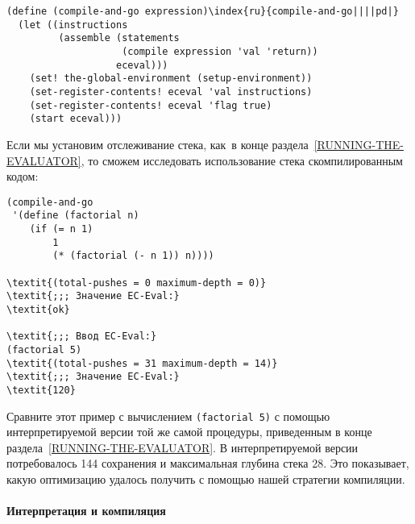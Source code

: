 \begin{Verbatim}[fontsize=\small]
(define (compile-and-go expression)\index{ru}{compile-and-go||||pd|}
  (let ((instructions
         (assemble (statements
                    (compile expression 'val 'return))
                   eceval)))
    (set! the-global-environment (setup-environment))
    (set-register-contents! eceval 'val instructions)
    (set-register-contents! eceval 'flag true)
    (start eceval)))
\end{Verbatim}

Если мы установим  
отслеживание стека, как~в конце 
раздела~\ref{RUNNING-THE-EVALUATOR}, то сможем исследовать
использование стека скомпилированным кодом:

\begin{Verbatim}[fontsize=\small]
(compile-and-go
 '(define (factorial n)
    (if (= n 1)
        1
        (* (factorial (- n 1)) n))))

\textit{(total-pushes = 0 maximum-depth = 0)}
\textit{;;; Значение EC-Eval:}
\textit{ok}

\textit{;;; Ввод EC-Eval:}
(factorial 5)
\textit{(total-pushes = 31 maximum-depth = 14)}
\textit{;;; Значение EC-Eval:}
\textit{120}
\end{Verbatim}
 Сравните этот пример с вычислением {\tt (factorial 5)} с
помощью интерпретируемой версии той же самой процедуры, приведенным в
конце раздела~\ref{RUNNING-THE-EVALUATOR}.  В
интерпретируемой версии потребовалось 144 сохранения и максимальная
глубина стека 28.  Это показывает, какую оптимизацию удалось
получить с помощью нашей стратегии компиляции.

\paragraph{Интерпретация и компиляция}


